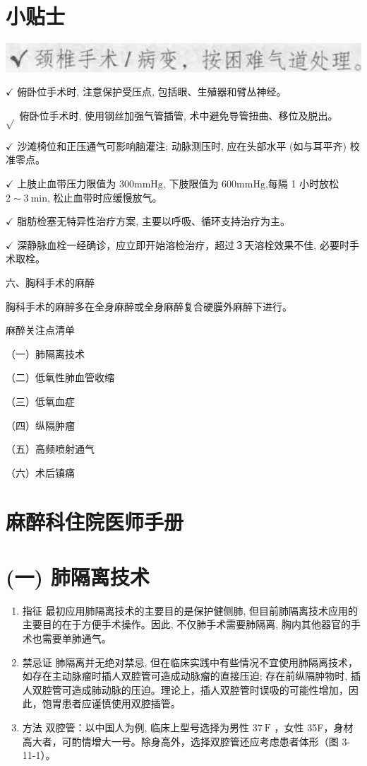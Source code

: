 \documentclass[10pt]{article}
\begin{document}
\section*{小贴士}
\begin{center}
\includegraphics[max width=\textwidth]{2024_07_05_645bb794a4d4f32ee0c8g-219}
\end{center}

$\checkmark$ 俯卧位手术时, 注意保护受压点, 包括眼、生殖器和臂丛神经。

$\sqrt{ }$ 俯卧位手术时, 使用钢丝加强气管插管, 术中避免导管扭曲、移位及脱出。

$\checkmark$ 沙滩椅位和正压通气可影响脑灌注; 动脉测压时, 应在头部水平 (如与耳平齐) 校准零点。

$\checkmark$ 上肢止血带压力限值为 $300 \mathrm{mmHg}$, 下肢限值为 $600 \mathrm{mmHg}$,每隔 1 小时放松 $2 \sim 3 \mathrm{~min}$, 松止血带时应缓慢放气。

$\checkmark$ 脂肪检塞无特异性治疗方案, 主要以呼吸、循环支持治疗为主。

$\checkmark$ 深静脉血栓一经确诊，应立即开始溶检治疗，超过３天溶栓效果不佳, 必要时手术取栓。

六、胸科手术的麻醉

胸科手术的麻醉多在全身麻醉或全身麻醉复合硬膜外麻醉下进行。

麻醉关注点清单

（一）肺隔离技术

（二）低氧性肺血管收缩

（三）低氧血症

（四）纵隔肿瘤

（五）高频喷射通气

（六）术后镇痛

\section*{麻醉科住院医师手册}
\section*{(一) 肺隔离技术}
\begin{enumerate}
  \item 指征 最初应用肺隔离技术的主要目的是保护健侧肺, 但目前肺隔离技术应用的主要目的在于方便手术操作。因此, 不仅肺手术需要肺隔离, 胸内其他器官的手术也需要单肺通气。

  \item 禁忌证 肺隔离并无绝对禁忌, 但在临床实践中有些情况不宜使用肺隔离技术，如存在主动脉瘤时插人双腔管可造成动脉瘤的直接压迫; 存在前纵隔肿物时, 插人双腔管可造成肺动脉的压迫。理论上，插人双腔管时误吸的可能性增加，因此，饱胃患者应谨慎使用双腔插管。

  \item 方法 双腔管：以中国人为例, 临床上型号选择为男性 $37 \mathrm{~F}$ ，女性 35F，身材高大者，可酌情增大一号。除身高外，选择双腔管还应考虑患者体形（图 3-11-1）。

\end{enumerate}
\end{document}
